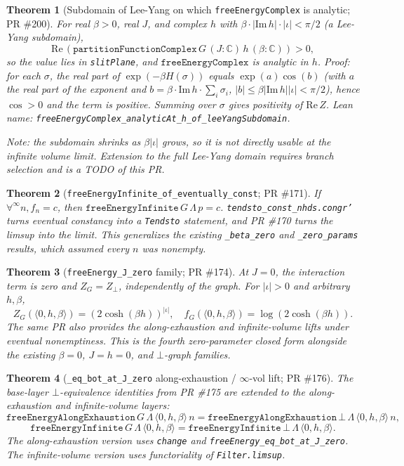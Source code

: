 \documentclass[a4paper,11pt]{article}
\newtheorem{theorem}{Theorem}
\begin{document}
\begin{theorem}[Subdomain of Lee-Yang on which \texttt{freeEnergyComplex} is analytic; PR \#200]
For real $\beta > 0$, real $J$, and complex $h$ with
$\beta \cdot |\mathrm{Im}\,h| \cdot |\iota| < \pi / 2$ (a Lee-Yang
subdomain),
\[
  \mathrm{Re}\,(\texttt{partitionFunctionComplex}\,G\,(J:\mathbb C)\,h\,(\beta:\mathbb C)) > 0,
\]
so the value lies in \texttt{slitPlane}, and
$\texttt{freeEnergyComplex}$ is analytic in $h$.
Proof: for each $\sigma$, the real part of $\exp(-\beta H(\sigma))$
equals $\exp(a) \cos(b)$
(with $a$ the real part of the exponent and
$b = \beta \cdot \mathrm{Im}\,h \cdot \sum_i \sigma_i$,
$|b| \le \beta |\mathrm{Im}\,h| |\iota| < \pi/2$), hence $\cos > 0$ and
the term is positive. Summing over $\sigma$ gives positivity of
$\mathrm{Re}\,Z$. Lean name:
\texttt{freeEnergyComplex\_analyticAt\_h\_of\_leeYangSubdomain}.

Note: the subdomain shrinks as $\beta |\iota|$ grows, so it is not
directly usable at the infinite volume limit. Extension to the full
Lee-Yang domain requires branch selection and is a TODO of this PR.
\end{theorem}

\begin{theorem}[\texttt{freeEnergyInfinite\_of\_eventually\_const}; PR \#171]
If $\forall^\infty n, f_n = c$, then
$\texttt{freeEnergyInfinite}\,G\,\Lambda\,p = c$.
\texttt{tendsto\_const\_nhds.congr'} turns eventual constancy into a
\texttt{Tendsto} statement, and PR \#170 turns the limsup into the limit.
This generalizes the existing \texttt{\_beta\_zero} and
\texttt{\_zero\_params} results, which assumed every $n$ was nonempty.
\end{theorem}

\begin{theorem}[\texttt{freeEnergy\_J\_zero} family; PR \#174]
At $J = 0$, the interaction term is zero and $Z_G = Z_\bot$, independently
of the graph. For $|\iota| > 0$ and arbitrary $h, \beta$,
\[
  Z_G(\langle 0, h, \beta\rangle) = (2 \cosh(\beta h))^{|\iota|},
  \quad
  f_G(\langle 0, h, \beta\rangle) = \log(2 \cosh(\beta h)).
\]
The same PR also provides the along-exhaustion and infinite-volume lifts
under eventual nonemptiness. This is the fourth zero-parameter closed form
alongside the existing $\beta = 0$, $J = h = 0$, and $\bot$-graph families.
\end{theorem}

\begin{theorem}[\texttt{\_eq\_bot\_at\_J\_zero} along-exhaustion / $\infty$-vol lift; PR \#176]
The base-layer $\bot$-equivalence identities from PR \#175 are extended to
the along-exhaustion and infinite-volume layers:
\[
  \texttt{freeEnergyAlongExhaustion}\,G\,\Lambda\,\langle 0,h,\beta\rangle\,n
    = \texttt{freeEnergyAlongExhaustion}\,\bot\,\Lambda\,\langle 0,h,\beta\rangle\,n,
\]
\[
  \texttt{freeEnergyInfinite}\,G\,\Lambda\,\langle 0,h,\beta\rangle
    = \texttt{freeEnergyInfinite}\,\bot\,\Lambda\,\langle 0,h,\beta\rangle.
\]
The along-exhaustion version uses \texttt{change} and
\texttt{freeEnergy\_eq\_bot\_at\_J\_zero}. The infinite-volume version uses
functoriality of \texttt{Filter.limsup}.
\end{theorem}
\end{document}
